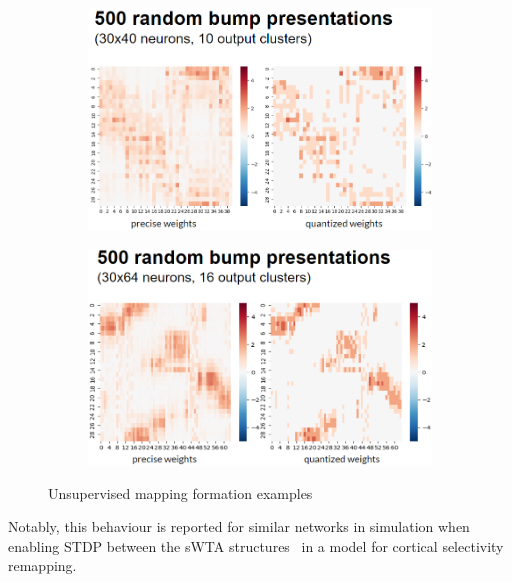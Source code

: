 \begin{figure}[b!]
    \begin{subfigure}{.45\textwidth}
        \centering
        \includegraphics[width=\linewidth]{img/chapter5/unsupervised_mapping_500_smaller.png}
        \caption{}
        \label{fig:unsupervised_mapping_example_smaller}
    \end{subfigure}
    \hfill
    \begin{subfigure}{.44\textwidth}
        \centering
        \includegraphics[width=\linewidth]{img/chapter5/unsupervised_mapping_500_bigger.png}
        \caption{}
        \label{fig:unsupervised_mapping_example_bigger}
    \end{subfigure}
    \caption[Unsupervised mapping formation examples]{Unsupervised mapping formation examples}
    \label{fig:unsupervised_mapping_examples}
\end{figure}

Notably, this behaviour is reported for similar networks in simulation when enabling STDP between the sWTA structures~\cite{Song_Abbott01} in a model for cortical selectivity remapping.

